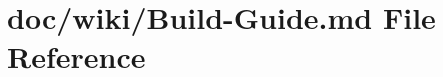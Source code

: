 \hypertarget{_build-_guide_8md}{}\section{doc/wiki/\+Build-\/\+Guide.md File Reference}
\label{_build-_guide_8md}
